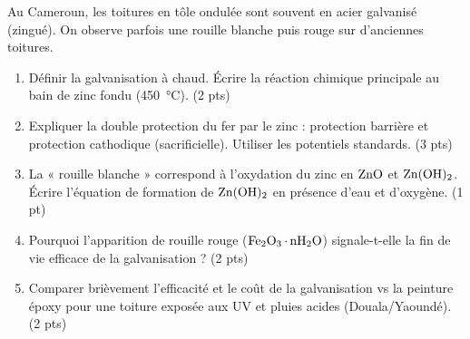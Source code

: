 \documentclass[11pt]{article}
\begin{document}
\begin{exercice}
Au Cameroun, les toitures en tôle ondulée sont souvent en acier galvanisé (zingué). On observe parfois une rouille blanche puis rouge sur d'anciennes toitures.
\begin{enumerate}
    \item Définir la galvanisation à chaud. Écrire la réaction chimique principale au bain de zinc fondu (\SI{450}{\celsius}). (2 pts)
    \item Expliquer la double protection du fer par le zinc : protection barrière et protection cathodique (sacrificielle). Utiliser les potentiels standards. (3 pts)
    \item La « rouille blanche » correspond à l'oxydation du zinc en $\ce{ZnO}$ et $\ce{Zn(OH)2}$. Écrire l'équation de formation de $\ce{Zn(OH)2}$ en présence d'eau et d'oxygène. (1 pt)
    \item Pourquoi l'apparition de rouille rouge ($\ce{Fe2O3.nH2O}$) signale-t-elle la fin de vie efficace de la galvanisation ? (2 pts)
    \item Comparer brièvement l'efficacité et le coût de la galvanisation vs la peinture époxy pour une toiture exposée aux UV et pluies acides (Douala/Yaoundé). (2 pts)
\end{enumerate}
\end{exercice}
\end{document}
